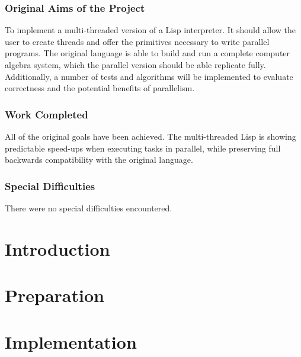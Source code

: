 \documentclass[a4paper,12pt,twoside,openright]{report}
\begin{document}
\subsection*{Original Aims of the Project}

To implement a multi-threaded version of a Lisp interpreter. It should
allow the user to create threads and offer the primitives necessary to
write parallel programs. The original language is able to build and
run a complete computer algebra system, which the parallel version should
be able replicate fully. Additionally, a number of tests and algorithms will
be implemented to evaluate correctness and the potential benefits of parallelism.

\subsection*{Work Completed}

All of the original goals have been achieved. The multi-threaded Lisp
is showing predictable speed-ups when executing tasks in parallel,
while preserving full backwards compatibility with the original language.

\subsection*{Special Difficulties}
There were no special difficulties encountered.

\newpage

\setcounter{tocdepth}{2}
\tableofcontents

\newpage


\pagestyle{headings}

\setcounter{page}{0}

\chapter{Introduction}


\chapter{Preparation}


\chapter{Implementation}

\end{document}

